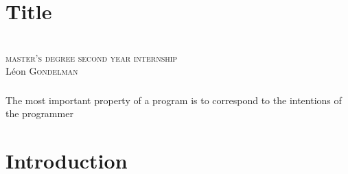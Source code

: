 \newenvironment{aquote}[1]
  {\savebox\mybox{#1}\begin{quote}}
  {\signed{\usebox\mybox}\end{quote}}




\newcommand{\bwedge}{\boldsymbol{~\wedge~}}
\newcommand{\bvee}{\boldsymbol{~\vee~}}
\newcommand{\brarr}{\boldsymbol{~\Rightarrow~}}


\newcommand{\crond}[2]{
\tikz \node[draw,circle,scale=0.21,fill=#2]{\black \Huge  \textbf{#1}};}
\newcommand{\rond}[1]{
\tikz \node[draw,circle,scale=0.21,fill=red]{\black \Huge  \textbf{#1}};}

\section*{Title}
\begin{frame}
\begin{center}
\vspace{-1.cm}

\textsc{}\\
 \textsc{ \scriptsize master's degree second year internship}\\[0.4cm]
{\small  L\'eon \textsc{Gondelman}}  \\[0.5cm]
\end{center}
\end{frame}





\begin{frame}\frametitle{}
   The most important property of a program is to correspond to the intentions of the programmer
\end{frame}

\section*{Introduction}
